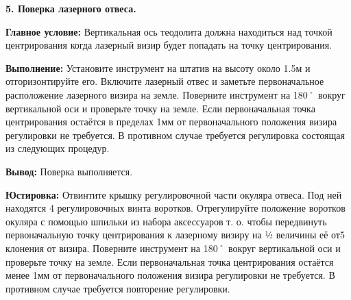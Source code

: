 \documentclass[a4paper]{article}
\begin{document}
\begin{newpage}
{        \par\textbf{5. Поверка лазерного отвеса.}
        \par\textbf{Главное условие:} Вертикальная ось теодолита должна находиться над точкой центрирования когда лазерный визир будет попадать на точку центрирования.
        \par\textbf{Выполнение:} Установите инструмент на штатив на высоту около 1.5м и отгоризонтируйте его. Включите лазерный отвес и заметьте первоначальное расположение лазерного визира на земле. Поверните инструмент на 180˚ вокруг вертикальной оси и проверьте точку на земле. Если первоначальная точка центрирования остаётся в пределах 1мм от первоначального положения визира регулировки не требуется. В противном случае требуется регулировка состоящая из следующих процедур.
        \par\textbf{Вывод:} Поверка выполняется.
        \par\textbf{Юстировка:} Отвинтите крышку регулировочной части окуляра отвеса. Под ней находятся 4 регулировочных винта воротков. Отрегулируйте положение воротков окуляра с помощью шпильки из набора аксессуаров т. о. чтобы передвинуть первоначальную точку центрирования к лазерному визиру на ½ величины её от5 клонения от визира. Поверните инструмент на 180˚ вокруг вертикальной оси и проверьте точку на земле. Если первоначальная точка центрирования остаётся менее 1мм от первоначального положения визира регулировки не требуется. В противном случае требуется повторение регулировки.\\
    }

\end{newpage}
\end{document}
